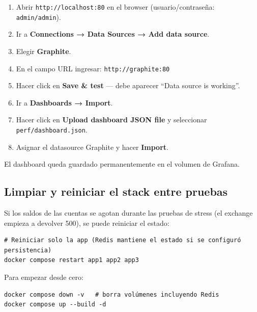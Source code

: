 \begin{enumerate}[leftmargin=*]
    \item Abrir \texttt{http://localhost:80} en el browser (usuario/contraseña: \texttt{admin/admin}).
    \item Ir a \textbf{Connections → Data Sources → Add data source}.
    \item Elegir \textbf{Graphite}.
    \item En el campo URL ingresar: \texttt{http://graphite:80}
    \item Hacer click en \textbf{Save \& test} — debe aparecer ``Data source is working''.
    \item Ir a \textbf{Dashboards → Import}.
    \item Hacer click en \textbf{Upload dashboard JSON file} y seleccionar \texttt{perf/dashboard.json}.
    \item Asignar el datasource Graphite y hacer \textbf{Import}.
\end{enumerate}

El dashboard queda guardado permanentemente en el volumen de Grafana.

\subsection{Limpiar y reiniciar el stack entre pruebas}

Si los saldos de las cuentas se agotan durante las pruebas de stress (el exchange empieza a devolver 500), se puede reiniciar el estado:

\begin{verbatim}
# Reiniciar solo la app (Redis mantiene el estado si se configuró persistencia)
docker compose restart app1 app2 app3
\end{verbatim}

Para empezar desde cero:

\begin{verbatim}
docker compose down -v   # borra volúmenes incluyendo Redis
docker compose up --build -d
\end{verbatim}

